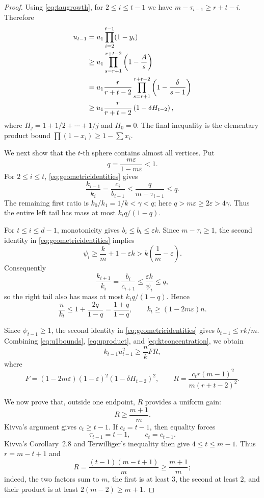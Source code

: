 \documentclass[11pt]{amsart}
\theoremstyle{definition}
\newcommand{\eps}{\varepsilon}
\newcommand{\gam}{\gamma}
\begin{document}
\begin{proof}
Using \eqref{eq:taugrowth}, for $2\le i\le t-1$ we have $m-\tau_{i-1}\ge r+t-i$.  Therefore
\begin{align}
 u_{t-1}
 &=u_1\prod_{i=2}^{t-1}(1-y_i)\notag\\
 &\ge u_1\prod_{s=r+1}^{r+t-2}\left(1-\frac{A}{s}\right)\notag\\
 &=u_1\frac{r}{r+t-2}
 \prod_{s=r+1}^{r+t-2}\left(1-\frac{\delta}{s-1}\right)\notag\\
 &\ge u_1\frac{r}{r+t-2}
 \left(1-\delta H_{t-2}\right),\label{eq:uproduct}
\end{align}
where $H_j=1+1/2+\cdots+1/j$ and $H_0=0$.  The final inequality is the elementary product bound $\prod(1-x_i)\ge1-\sum x_i$.

We next show that the $t$-th sphere contains almost all vertices.  Put
\begin{equation}\label{eq:qdef}
  q=\frac{m\eps}{1-m\eps}<1.
\end{equation}
For $2\le i\le t$, \eqref{eq:geometricidentities} gives
\[
  \frac{k_{i-1}}{k_i}=\frac{c_i}{b_{i-1}}
  \le\frac{q}{m-\tau_{i-1}}\le q.
\]
The remaining first ratio is $k_0/k_1=1/k<\gam<q$; here $q>m\eps\ge2\eps>4\gam$.  Thus the entire left tail has mass at most $k_t q/(1-q)$.

For $t\le i\le d-1$, monotonicity gives $b_i\le b_t\le\eps k$.  Since $m-\tau_i\ge1$, the second identity in \eqref{eq:geometricidentities} implies
\[
  \psi_i\ge \frac{k}{m}+1-\eps k>k\left(\frac1m-\eps\right).
\]
Consequently
\[
  \frac{k_{i+1}}{k_i}=\frac{b_i}{c_{i+1}}
  \le\frac{\eps k}{\psi_i}\le q,
\]
so the right tail also has mass at most $k_t q/(1-q)$.  Hence
\begin{equation}\label{eq:ktconcentration}
  \frac{n}{k_t}\le1+\frac{2q}{1-q}=\frac{1+q}{1-q},
  \qquad
  k_t\ge(1-2m\eps)n.
\end{equation}

Since $\psi_{t-1}\ge1$, the second identity in \eqref{eq:geometricidentities} gives $b_{t-1}\le rk/m$.  Combining \eqref{eq:u1bounds}, \eqref{eq:uproduct}, and \eqref{eq:ktconcentration}, we obtain
\begin{equation}\label{eq:multiplicitycertificate}
  k_{t-1}u_{t-1}^2
  \ge\frac{n}{k}FR,
\end{equation}
where
\begin{equation}\label{eq:FR}
  F=(1-2m\eps)(1-\eps)^2
  \left(1-\delta H_{t-2}\right)^2,
  \qquad
  R=\frac{c_t r(m-1)^2}{m(r+t-2)^2}.
\end{equation}

We now prove that, outside one endpoint, $R$ provides a uniform gain:
\begin{equation}\label{eq:Rgain}
  R\ge\frac{m+1}{m}.
\end{equation}
Kivva's argument gives $c_t\ge t-1$.  If $c_t=t-1$, then equality forces
\[
  \tau_{t-1}=t-1,\qquad c_t=c_{t-1}.
\]
Kivva's Corollary~2.8 and Terwilliger's inequality then give $4\le t\le m-1$.  Thus $r=m-t+1$ and
\[
  R=\frac{(t-1)(m-t+1)}{m}\ge\frac{m+1}{m};
\]
indeed, the two factors sum to $m$, the first is at least $3$, the second at least $2$, and their product is at least $2(m-2)\ge m+1$.


\end{proof}
\end{document}
